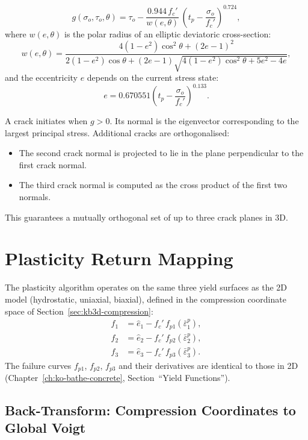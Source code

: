 \begin{equation}
  g(\sigma_o, \tau_o, \theta) = \tau_o - \frac{0.944\,f_c'}{w(e, \theta)} \,
  \left(t_p - \frac{\sigma_o}{f_c'}\right)^{0.724},
  \label{eq:crack-function-3d}
\end{equation}
where $w(e, \theta)$ is the polar radius of an elliptic deviatoric cross-section:
\[
  w(e,\theta) = \frac{4(1-e^2)\cos^2\theta + (2e-1)^2}
  {2(1-e^2)\cos\theta + (2e-1)\sqrt{4(1-e^2)\cos^2\theta + 5e^2 - 4e}},
\]
and the eccentricity $e$ depends on the current stress state:
\begin{equation}
  e = 0.670551 \left(t_p - \frac{\sigma_o}{f_c'}\right)^{0.133}.
\end{equation}

A crack initiates when $g > 0$.  Its normal is the eigenvector corresponding
to the largest principal stress.  Additional cracks are orthogonalised:
\begin{itemize}
  \item The second crack normal is projected to lie in the plane
        perpendicular to the first crack normal.
  \item The third crack normal is computed as the cross product of the
        first two normals.
\end{itemize}
This guarantees a mutually orthogonal set of up to three crack planes in 3D.


\section{Plasticity Return Mapping}
\label{sec:kb3d-plasticity}

The plasticity algorithm operates on the same three yield surfaces as the 2D
model (hydrostatic, uniaxial, biaxial), defined in the compression coordinate
space of Section~\ref{sec:kb3d-compression}:
\begin{align}
  f_1 &= \hat{e}_1 - f_c'\,f_{p1}(\bar\varepsilon^p_1), \label{eq:f1-3d} \\
  f_2 &= \hat{e}_2 - f_c'\,f_{p2}(\bar\varepsilon^p_2), \\
  f_3 &= \hat{e}_3 - f_c'\,f_{p3}(\bar\varepsilon^p_3). \label{eq:f3-3d}
\end{align}
The failure curves $f_{p1}$, $f_{p2}$, $f_{p3}$ and their derivatives are
identical to those in 2D (Chapter~\ref{ch:ko-bathe-concrete},
Section~``Yield Functions'').

\subsection{Back-Transform: Compression Coordinates to Global Voigt}


